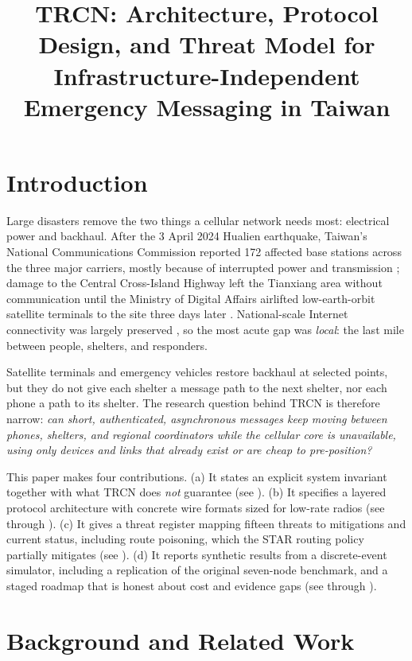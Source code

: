 \documentclass[jou,a4paper,11pt,floatsintext]{apa7}
\title{TRCN: Architecture, Protocol Design, and Threat Model for Infrastructure-Independent Emergency Messaging in Taiwan}
\begin{document}
\maketitle

\section{Introduction}

Large disasters remove the two things a cellular network needs most: electrical power and backhaul. After the 3 April 2024 Hualien earthquake, Taiwan's National Communications Commission reported 172 affected base stations across the three major carriers, mostly because of interrupted power and transmission \parencite{cna2024}; damage to the Central Cross-Island Highway left the Tianxiang area without communication until the Ministry of Digital Affairs airlifted low-earth-orbit satellite terminals to the site three days later \parencite{moda2024}. National-scale Internet connectivity was largely preserved \parencite{isoc2024}, so the most acute gap was \emph{local}: the last mile between people, shelters, and responders.

Satellite terminals and emergency vehicles restore backhaul at selected points, but they do not give each shelter a message path to the next shelter, nor each phone a path to its shelter. The research question behind TRCN is therefore narrow: \emph{can short, authenticated, asynchronous messages keep moving between phones, shelters, and regional coordinators while the cellular core is unavailable, using only devices and links that already exist or are cheap to pre-position?}

This paper makes four contributions. (a) It states an explicit system invariant together with what TRCN does \emph{not} guarantee (see ). (b) It specifies a layered protocol architecture with concrete wire formats sized for low-rate radios (see  through ). (c) It gives a threat register mapping fifteen threats to mitigations and current status, including route poisoning, which the STAR routing policy partially mitigates (see ). (d) It reports synthetic results from a discrete-event simulator, including a replication of the original seven-node benchmark, and a staged roadmap that is honest about cost and evidence gaps (see  through ).

\section{Background and Related Work}
\end{document}
